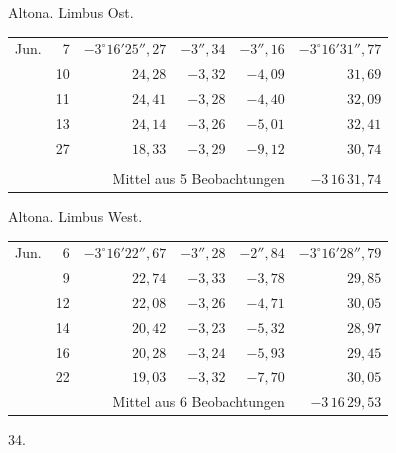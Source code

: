 \noindent\begin{minipage}[t]{.495\textwidth}\centering Altona. Limbus Ost.\par\smallskip
{\scriptsize\setlength{\tabcolsep}{1pt}\renewcommand{\arraystretch}{1.2}\begin{tabular}{lr|r|r|r|r|}
Jun.&7&$-3^\circ16'25''{,}27$&$-3''{,}34$&$-3''{,}16$&$-3^\circ16'31''{,}77$\\
&10&$24{,}28$&$-3{,}32$&$-4{,}09$&$31{,}69$\\
&11&$24{,}41$&$-3{,}28$&$-4{,}40$&$32{,}09$\\
&13&$24{,}14$&$-3{,}26$&$-5{,}01$&$32{,}41$\\
&27&$18{,}33$&$-3{,}29$&$-9{,}12$&$30{,}74$\\
&&&&&\\
\cline{6-6}\multicolumn{5}{r}{Mittel aus 5 Beobachtungen}&$-3\,16\,31{,}74$
\end{tabular}}\end{minipage}\hfill\begin{minipage}[t]{.495\textwidth}\centering Altona. Limbus West.\par\smallskip
{\scriptsize\setlength{\tabcolsep}{1pt}\renewcommand{\arraystretch}{1.2}\begin{tabular}{lr|r|r|r|r}
Jun.&6&$-3^\circ16'22''{,}67$&$-3''{,}28$&$-2''{,}84$&$-3^\circ16'28''{,}79$\\
&9&$22{,}74$&$-3{,}33$&$-3{,}78$&$29{,}85$\\
&12&$22{,}08$&$-3{,}26$&$-4{,}71$&$30{,}05$\\
&14&$20{,}42$&$-3{,}23$&$-5{,}32$&$28{,}97$\\
&16&$20{,}28$&$-3{,}24$&$-5{,}93$&$29{,}45$\\
&22&$19{,}03$&$-3{,}32$&$-7{,}70$&$30{,}05$\\
\cline{6-6}\multicolumn{5}{r}{Mittel aus 6 Beobachtungen}&$-3\,16\,29{,}53$
\end{tabular}}\end{minipage}
\par\vspace{4mm}
\begin{center}34.\end{center}

